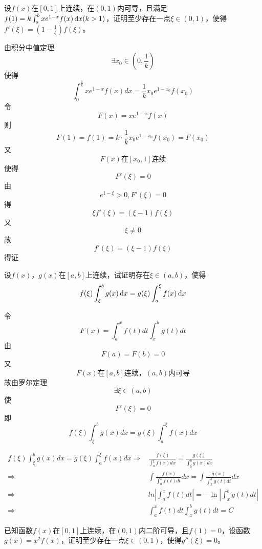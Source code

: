 \begin{example}
	设$f(x)$在$[0,1]$上连续，在$(0,1)$内可导，且满足$f(1)=k\int_{a}^{b}xe^{1-x}f(x)\,\mathrm{d} x(k>1)$，证明至少存在一点$\xi\in(0,1)$，使得$f'(\xi)=(1-\frac{1}{\xi})f(\xi)$。
\end{example}
	\begin{newproof}
		由积分中值定理\[\exists x_0\in \left( 0,\frac{1}{k} \right) \]
		使得\[\int_0^{\frac{1}{k}}{xe^{1-x}f\left( x \right) dx}=\frac{1}{k}x_0e^{1-x_0}f\left( x_0 \right) \]
		令\[F\left( x \right) =xe^{1-x}f\left( x \right) \]
		则\[F\left( 1 \right) =f\left( 1 \right) =k\cdot \frac{1}{k}x_0e^{1-x_0}f\left( x_0 \right) =F\left( x_0 \right) \]
		又\[F\left( x \right) \text{在}\left[ x_0,1 \right] \text{连续}\]
		使得\[F'\left( \xi \right) =0\]
		由\[e^{1-\xi}>0,F'\left( \xi \right) =0\]
		得\[\xi f'\left( \xi \right) =\left( \xi -1 \right) f\left( \xi \right) \]
		又\[\xi \ne 0\]
		故\[f'\left( \xi \right) =\left( \xi -1 \right) f\left( \xi \right) \]
		得证
	\end{newproof}

\begin{example}
	设$f(x)$，$g(x)$在$[a,b]$上连续，试证明存在$\xi\in(a,b)$，使得\[f(\xi)\int_{\xi}^{b}g(x)\,\mathrm{d} x=g(\xi)\int_{a}^{\xi}f(x)\,\mathrm{d} x\]
\end{example}
	\begin{newproof}
		令\[F\left( x \right) =\int_a^x{f\left( t \right) dt}\int_x^b{g\left( t \right) dt}\]
		由\[F\left( a \right) =F\left( b \right) =0\]
		又\[F\left( x \right) \text{在}\left[ a,b \right] \text{连续，}\left( a,b \right) \text{内可导}\]
		故由罗尔定理\[\exists \xi \in \left( a,b \right) \]
		使\[F'\left( \xi \right) =0\]
		即\[f\left( \xi \right) \int_{\xi}^b{g\left( x \right) dx}=g\left( \xi \right) \int_a^{\xi}{f\left( x \right) dx}\]
	\end{newproof}
	\begin{note}
		\begin{align*}
			f\left( \xi \right) \int_{\xi}^b{g\left( x \right) dx}=g\left( \xi \right) \int_a^{\xi}{f\left( x \right) dx}
			\Longrightarrow {}&
			\frac{\,\,f\left( \xi \right)}{\int_a^{\xi}{f\left( x \right) dx}}=\frac{g\left( \xi \right)}{\int_{\xi}^b{g\left( x \right) dx}}\\
			\Longrightarrow {}&
			\int{\frac{\,\,f\left( x \right)}{\int_a^x{f\left( t \right) dt}}dx}=\int{\frac{g\left( x \right)}{\int_x^b{g\left( t \right) dt}}dx}\\
			\Longrightarrow {}&
			ln|\int_a^x{f\left( t \right) dt}|=-\ln |\int_x^b{g\left( t \right) dt}|\\
			\Longrightarrow {}&
			\int_a^x{f\left( t \right) dt}\int_x^b{g\left( t \right) dt}=C
		\end{align*}
	\end{note}
\begin{example}
	已知函数$f(x)$在$[0,1]$上连续，在$(0,1)$内二阶可导，且$f(1)=0$，设函数$g(x)=x^2f(x)$，证明至少存在一点$\xi\in(0,1)$，使得$g''(\xi)=0$。
\end{example}

